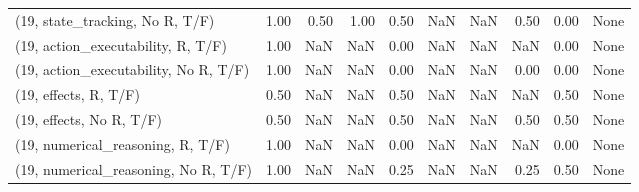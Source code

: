 \begin{table*}[h!]
\begin{adjustbox}{width=2\columnwidth,center}
\begin{tabular}{lrrr|rrr|rrr}
(19, state\_tracking, No R, T/F)       &                      1.00 &                  0.50 &                      1.00 &                          0.50 &                       NaN &                           NaN &                                   0.50 &                               0.00 &                                  None \\
(19, action\_executability, R, T/F)    &                      1.00 &                   NaN &                       NaN &                          0.00 &                       NaN &                           NaN &                                    NaN &                               0.00 &                                  None \\
(19, action\_executability, No R, T/F) &                      1.00 &                   NaN &                       NaN &                          0.00 &                       NaN &                           NaN &                                   0.00 &                               0.00 &                                  None \\
(19, effects, R, T/F)                 &                      0.50 &                   NaN &                       NaN &                          0.50 &                       NaN &                           NaN &                                    NaN &                               0.50 &                                  None \\
(19, effects, No R, T/F)              &                      0.50 &                   NaN &                       NaN &                          0.50 &                       NaN &                           NaN &                                   0.50 &                               0.50 &                                  None \\
(19, numerical\_reasoning, R, T/F)     &                      1.00 &                   NaN &                       NaN &                          0.00 &                       NaN &                           NaN &                                    NaN &                               0.00 &                                  None \\
(19, numerical\_reasoning, No R, T/F)  &                      1.00 &                   NaN &                       NaN &                          0.25 &                       NaN &                           NaN &                                   0.25 &                               0.50 &                                  None \\

\end{tabular}
\end{adjustbox}
\end{table*}
